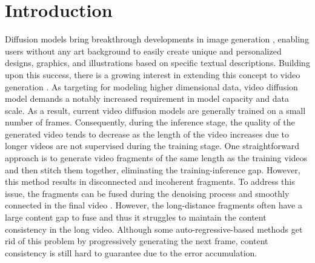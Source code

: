 \section{Introduction}

Diffusion models bring breakthrough developments in image generation \citep{ldm}, enabling users without any art background to easily create unique and personalized designs, graphics, and illustrations based on specific textual descriptions. Building upon this success, there is a growing interest in extending this concept to video generation \citep{lvdm, ge2023preserve, blattmann2023align, wang2023videocomposer, luo2023videofusion}.
%
%
As targeting for modeling higher dimensional data, video diffusion model demands a notably increased requirement in model capacity and data scale. As a result, current video diffusion models are generally trained on a small number of frames. Consequently, during the inference stage, the quality of the generated video tends to decrease as the length of the video increases due to longer videos are not supervised during the training stage.
%
One straightforward approach is to generate video fragments of the same length as the training videos and then stitch them together, eliminating the training-inference gap. However, this method results in disconnected and incoherent fragments. To address this issue, the fragments can be fused during the denoising process and smoothly connected in the final video \citep{wang2023gen}. 
%
However, the long-distance fragments often have a large content gap to fuse and thus it struggles to maintain the content consistency in the long video. Although some auto-regressive-based methods \citep{villegas2022phenaki} get rid of this problem by progressively generating the next frame, content consistency is still hard to guarantee due to the error accumulation. 


